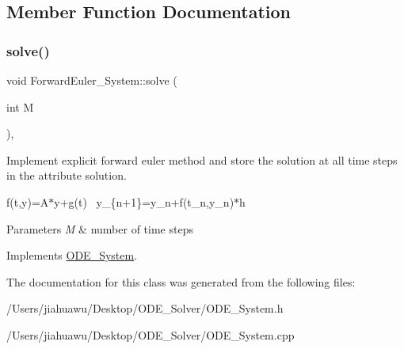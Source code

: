 \subsection{Member Function Documentation}
\mbox{\label{class_forward_euler___system_a52532a83a016d8478a7c458881b214b4}} 
\subsubsection{\texorpdfstring{solve()}{solve()}}
{\footnotesize\ttfamily void Forward\+Euler\+\_\+\+System\+::solve (\begin{DoxyParamCaption}\item[{int}]{M }\end{DoxyParamCaption})\hspace{0.3cm}{\ttfamily [override]}, {\ttfamily [virtual]}}



Implement explicit forward euler method and store the solution at all time steps in the attribute solution. 

f(t,y)=A$\ast$y+g(t)~\newline
y\+\_\+\{n+1\}=y\+\_\+n+f(t\+\_\+n,y\+\_\+n)$\ast$h ~\newline

\begin{DoxyParams}{Parameters}
{\em M} & number of time steps \\
\hline
\end{DoxyParams}


Implements \mbox{\hyperlink{class_o_d_e___system_a5fe78282ecf67d851f1a2363a028e6dd}{O\+D\+E\+\_\+\+System}}.



The documentation for this class was generated from the following files\+:\begin{DoxyCompactItemize}
\item 
/\+Users/jiahuawu/\+Desktop/\+O\+D\+E\+\_\+\+Solver/O\+D\+E\+\_\+\+System.\+h\item 
/\+Users/jiahuawu/\+Desktop/\+O\+D\+E\+\_\+\+Solver/O\+D\+E\+\_\+\+System.\+cpp\end{DoxyCompactItemize}
